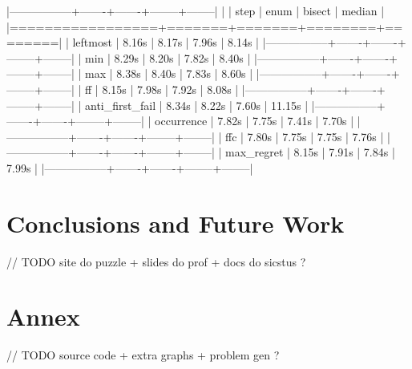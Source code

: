 \documentclass[runningheads]{llncs}
\begin{document}
|-----------------+-------+-------+--------+--------|
|                 | step  | enum  | bisect | median |
|=================+=======+=======+========+========|
| leftmost        | 8.16s | 8.17s | 7.96s  | 8.14s  |
|-----------------+-------+-------+--------+--------|
| min             | 8.29s | 8.20s | 7.82s  | 8.40s  |
|-----------------+-------+-------+--------+--------|
| max             | 8.38s | 8.40s | 7.83s  | 8.60s  |
|-----------------+-------+-------+--------+--------|
| ff              | 8.15s | 7.98s | 7.92s  | 8.08s  |
|-----------------+-------+-------+--------+--------|
| anti_first_fail | 8.34s | 8.22s | 7.60s  | 11.15s |
|-----------------+-------+-------+--------+--------|
| occurrence      | 7.82s | 7.75s | 7.41s  | 7.70s  |
|-----------------+-------+-------+--------+--------|
| ffc             | 7.80s | 7.75s | 7.75s  | 7.76s  |
|-----------------+-------+-------+--------+--------|
| max_regret      | 8.15s | 7.91s | 7.84s  | 7.99s  |
|-----------------+-------+-------+--------+--------|

\section{Conclusions and Future Work}

// TODO site do puzzle + slides do prof + docs do sicstus ?
\begin{thebibliography}{8}




\end{thebibliography}

\section{Annex}

// TODO source code + extra graphs + problem gen ?
\end{document}
